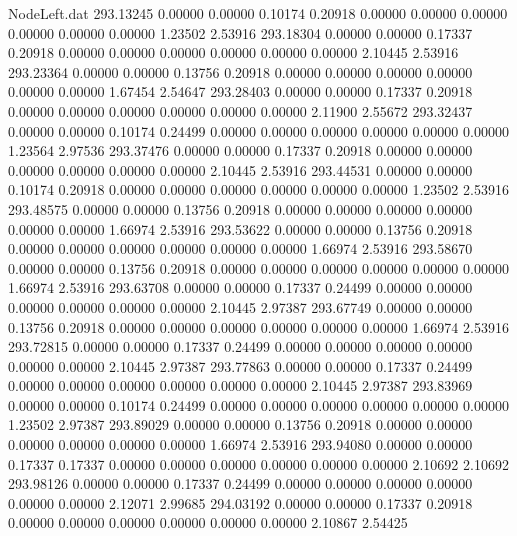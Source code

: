 \begin{filecontents}{NodeLeft.dat}
 293.13245    0.00000    0.00000     0.10174    0.20918    0.00000    0.00000    0.00000    0.00000    0.00000    0.00000    1.23502    2.53916
 293.18304    0.00000    0.00000     0.17337    0.20918    0.00000    0.00000    0.00000    0.00000    0.00000    0.00000    2.10445    2.53916
 293.23364    0.00000    0.00000     0.13756    0.20918    0.00000    0.00000    0.00000    0.00000    0.00000    0.00000    1.67454    2.54647
 293.28403    0.00000    0.00000     0.17337    0.20918    0.00000    0.00000    0.00000    0.00000    0.00000    0.00000    2.11900    2.55672
 293.32437    0.00000    0.00000     0.10174    0.24499    0.00000    0.00000    0.00000    0.00000    0.00000    0.00000    1.23564    2.97536
 293.37476    0.00000    0.00000     0.17337    0.20918    0.00000    0.00000    0.00000    0.00000    0.00000    0.00000    2.10445    2.53916
 293.44531    0.00000    0.00000     0.10174    0.20918    0.00000    0.00000    0.00000    0.00000    0.00000    0.00000    1.23502    2.53916
 293.48575    0.00000    0.00000     0.13756    0.20918    0.00000    0.00000    0.00000    0.00000    0.00000    0.00000    1.66974    2.53916
 293.53622    0.00000    0.00000     0.13756    0.20918    0.00000    0.00000    0.00000    0.00000    0.00000    0.00000    1.66974    2.53916
 293.58670    0.00000    0.00000     0.13756    0.20918    0.00000    0.00000    0.00000    0.00000    0.00000    0.00000    1.66974    2.53916
 293.63708    0.00000    0.00000     0.17337    0.24499    0.00000    0.00000    0.00000    0.00000    0.00000    0.00000    2.10445    2.97387
 293.67749    0.00000    0.00000     0.13756    0.20918    0.00000    0.00000    0.00000    0.00000    0.00000    0.00000    1.66974    2.53916
 293.72815    0.00000    0.00000     0.17337    0.24499    0.00000    0.00000    0.00000    0.00000    0.00000    0.00000    2.10445    2.97387
 293.77863    0.00000    0.00000     0.17337    0.24499    0.00000    0.00000    0.00000    0.00000    0.00000    0.00000    2.10445    2.97387
 293.83969    0.00000    0.00000     0.10174    0.24499    0.00000    0.00000    0.00000    0.00000    0.00000    0.00000    1.23502    2.97387
 293.89029    0.00000    0.00000     0.13756    0.20918    0.00000    0.00000    0.00000    0.00000    0.00000    0.00000    1.66974    2.53916
 293.94080    0.00000    0.00000     0.17337    0.17337    0.00000    0.00000    0.00000    0.00000    0.00000    0.00000    2.10692    2.10692
 293.98126    0.00000    0.00000     0.17337    0.24499    0.00000    0.00000    0.00000    0.00000    0.00000    0.00000    2.12071    2.99685
 294.03192    0.00000    0.00000     0.17337    0.20918    0.00000    0.00000    0.00000    0.00000    0.00000    0.00000    2.10867    2.54425

\end{filecontents}
